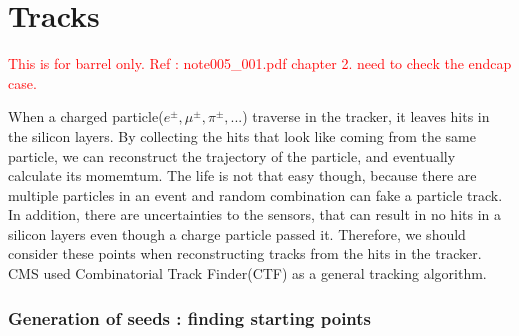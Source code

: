 %

\section{ Tracks }
\label{sec:track}
\textcolor{red}{This is for barrel only. 
Ref : note005\_001.pdf chapter 2.
need to check the endcap case.}

When a charged particle($e^\pm, \mu^\pm, \pi^\pm, ... $) traverse in the tracker,
it leaves hits in the silicon layers. By collecting the hits that 
look like coming from the same particle, we can reconstruct the 
trajectory of the particle, and eventually calculate its momemtum. 
The life is not that easy though, because there are multiple 
particles in an event and random combination can fake a particle track.  
In addition, there are uncertainties to the sensors, that 
can result in no hits in a silicon layers even though a charge 
particle passed it. Therefore, we should consider these points 
when reconstructing tracks from the hits in the tracker. 
CMS used Combinatorial Track Finder(CTF) as a general tracking 
algorithm.


\subsubsection{Generation of seeds : finding starting points}

